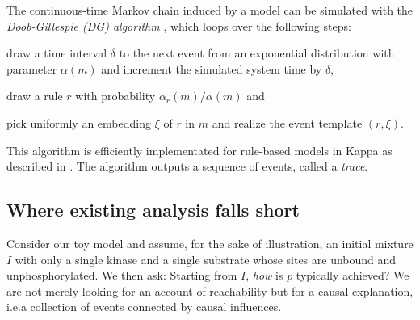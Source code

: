 The continuous-time Markov chain induced by a model can be simulated
with the \emph{Doob-Gillespie (DG) algorithm}
\cite{gillespie1977exact}, which loops over the following steps:
\begin{inparaenum}[(1)]
\item draw a time interval $\delta$ to the next event from an
  exponential distribution with parameter $\alpha(m)$ and increment
  the simulated system time by $\delta$,
\item draw a rule $r$ with probability $\alpha_r(m)/\alpha(m)$ and
\item pick uniformly an embedding $\xi$ of $r$ in $m$ and realize the
  event template $(r, \xi)$.
\end{inparaenum}
This algorithm is efficiently implementated for rule-based models in
Kappa as described in
\cite{DanosEtAl-APLAS07,BoutillierEK17}. The algorithm outputs a sequence of events,
called a \emph{trace}.

\longversion{}

\subsection{Where existing analysis falls short}
\label{subsec:dumb-story}


Consider our toy model and assume, for the
sake of illustration, an initial mixture $I$ with only a single kinase
and a single substrate whose sites are unbound and
unphosphorylated. We then ask: Starting from $I$, \emph{how} is $p$ typically achieved? We are not merely looking for an account of
reachability but for a causal explanation, i.e.\@ a collection of events connected by causal influences.

